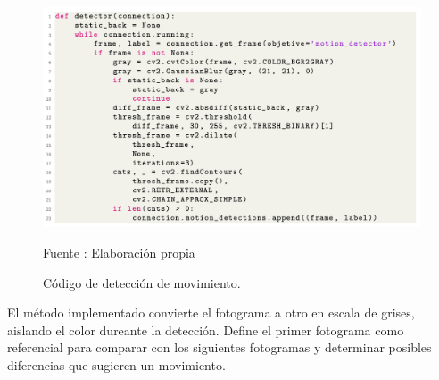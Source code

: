 \begin{itemize}
    \begin{figure}[H]
        \begin{center}
            \includegraphics[width=16cm]{img/capitulo_5/motion_detector.png}
        \end{center}
        \begin{center}
            \caption{Código de detección de movimiento.}
            Fuente : Elaboración propia
            \label{fig:motion_detector}
        \end{center}
    \end{figure}
    
    El método implementado convierte el fotograma a otro en escala de grises, aislando el color dureante la detección. Define el primer fotograma como referencial para comparar con los siguientes fotogramas y determinar posibles diferencias que sugieren un movimiento.\\ 
    
\end{itemize}

